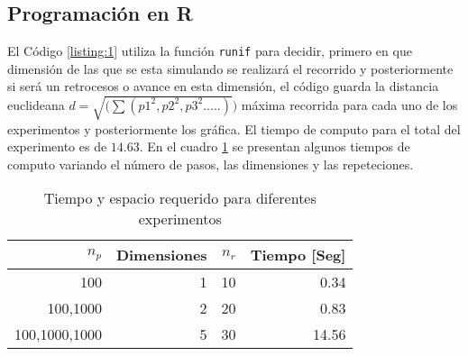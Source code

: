 \documentclass{article}
\begin{document}
\subsection{Programación en R}
El  Código \ref{listing:1} utiliza la función  \texttt{runif} para decidir, primero en que dimensión de las que se esta simulando se realizará el recorrido y posteriormente si será un retrocesos o avance en esta dimensión, el código guarda la distancia euclideana $d=\sqrt{(\sum(p1^2,p2^2,p3^2.....)})$ máxima recorrida  para cada uno de los experimentos y posteriormente los gráfica. El tiempo de computo para el total del experimento es de $14.63$. En el cuadro \ref{cuadro 1} se presentan algunos tiempos de computo variando el número de pasos, las dimensiones y las repeteciones.

\begin{table}[]
\centering
\caption{Tiempo y espacio requerido para diferentes experimentos}
\label{cuadro 1}
\begin{tabular}{|r|r|r|r|}
\hline
\textbf{$n_p$} & \textbf{Dimensiones} & \textbf{$n_r$} & \textbf{Tiempo {[}Seg{]}} \\ \hline
100            & 1                    & 10                    & 0.34                      \\ \hline
100,1000       & 2                    & 20                    & 0.83                      \\ \hline
100,1000,1000  & 5                    & 30                    & 14.56                     \\ \hline        
\end{tabular}
\end{table}
\lstset{language=Python}
\lstset{frame=lines}
\lstset{basicstyle=\footnotesize}
\end{document}
